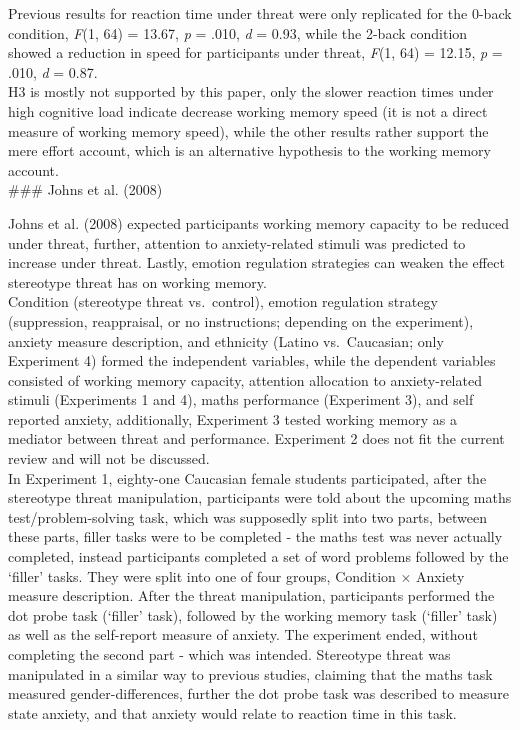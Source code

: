 \documentclass[
  stu,floatsintext]{apa7}
\begin{document}
Previous results for reaction time under threat were only replicated for the 0-back condition, \emph{F}(1, 64) = 13.67, \emph{p} = .010, \emph{d} = 0.93, while the 2-back condition showed a reduction in speed for participants under threat, \emph{F}(1, 64) = 12.15, \emph{p} = .010, \emph{d} = 0.87.\\
H3 is mostly not supported by this paper, only the slower reaction times under high cognitive load indicate decrease working memory speed (it is not a direct measure of working memory speed), while the other results rather support the mere effort account, which is an alternative hypothesis to the working memory account.\\
\#\#\# Johns et al. (2008)

Johns et al. (2008) expected participants working memory capacity to be reduced under threat, further, attention to anxiety-related stimuli was predicted to increase under threat.
Lastly, emotion regulation strategies can weaken the effect stereotype threat has on working memory.\\
Condition (stereotype threat vs.~control), emotion regulation strategy (suppression, reappraisal, or no instructions; depending on the experiment), anxiety measure description, and ethnicity (Latino vs.~Caucasian; only Experiment 4) formed the independent variables, while the dependent variables consisted of working memory capacity, attention allocation to anxiety-related stimuli (Experiments 1 and 4), maths performance (Experiment 3), and self reported anxiety, additionally, Experiment 3 tested working memory as a mediator between threat and performance.
Experiment 2 does not fit the current review and will not be discussed.\\
In Experiment 1, eighty-one Caucasian female students participated, after the stereotype threat manipulation, participants were told about the upcoming maths test/problem-solving task, which was supposedly split into two parts, between these parts, filler tasks were to be completed - the maths test was never actually completed, instead participants completed a set of word problems followed by the `filler' tasks.
They were split into one of four groups, Condition \(\times\) Anxiety measure description.
After the threat manipulation, participants performed the dot probe task (`filler' task), followed by the working memory task (`filler' task) as well as the self-report measure of anxiety.
The experiment ended, without completing the second part - which was intended.
Stereotype threat was manipulated in a similar way to previous studies, claiming that the maths task measured gender-differences, further the dot probe task was described to measure state anxiety, and that anxiety would relate to reaction time in this task.
\end{document}
